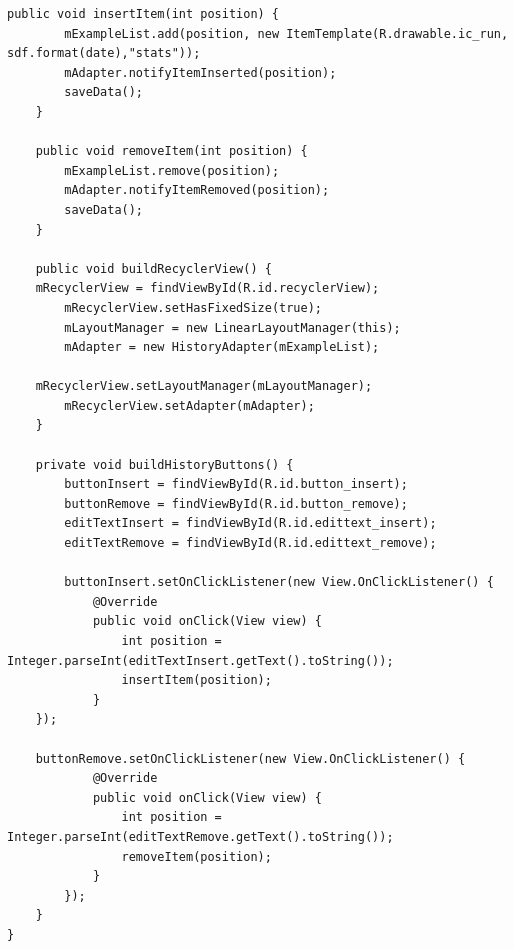 \documentclass[a4paper]{article}
\begin{document}
\begin{lstlisting}[style=java]
    public void insertItem(int position) {
        mExampleList.add(position, new ItemTemplate(R.drawable.ic_run, sdf.format(date),"stats"));
        mAdapter.notifyItemInserted(position);
        saveData();
    }

    public void removeItem(int position) {
        mExampleList.remove(position);
        mAdapter.notifyItemRemoved(position);
        saveData();
    }

    public void buildRecyclerView() {
    mRecyclerView = findViewById(R.id.recyclerView);
        mRecyclerView.setHasFixedSize(true);
        mLayoutManager = new LinearLayoutManager(this);
        mAdapter = new HistoryAdapter(mExampleList);

    mRecyclerView.setLayoutManager(mLayoutManager);
        mRecyclerView.setAdapter(mAdapter);
    }

    private void buildHistoryButtons() {
        buttonInsert = findViewById(R.id.button_insert);
        buttonRemove = findViewById(R.id.button_remove);
        editTextInsert = findViewById(R.id.edittext_insert);
        editTextRemove = findViewById(R.id.edittext_remove);

        buttonInsert.setOnClickListener(new View.OnClickListener() {
            @Override
            public void onClick(View view) {
                int position = Integer.parseInt(editTextInsert.getText().toString());
                insertItem(position);
            }
    });

    buttonRemove.setOnClickListener(new View.OnClickListener() {
            @Override
            public void onClick(View view) {
                int position = Integer.parseInt(editTextRemove.getText().toString());
                removeItem(position);
            }
        });
    }
}
\end{lstlisting}
\end{document}
